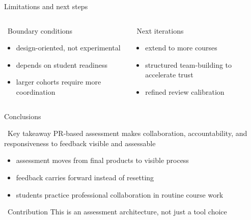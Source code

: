 \documentclass[
    NAME={Dr. Helga Ingimundardóttir},
    EMAIL={helgaingim@hi.is},
    FACULTY={Industrial Engineering},
    TITLE={Using Pull Requests to Make Collaboration Visible in CDIO Project-Based Courses},
    SEMINAR={22\textsuperscript{nd} International CDIO Conference},
    DATE={June 22\textsuperscript{nd} 2026},
    WIDE=true
]{HI-LaTeX/hi-beamer}
\begin{document}
\begin{frame}{Limitations and next steps}
\begin{columns}[T,onlytextwidth]
\begin{column}{.48\textwidth}
\begin{block}{\faLock~Boundary conditions}
\begin{itemize}
    \item design-oriented, not experimental
    \item depends on student readiness
    \item larger cohorts require more coordination
\end{itemize}
\end{block}
\end{column}
\begin{column}{.48\textwidth}
\begin{block}{\faArrowTrendUp~Next iterations}
\begin{itemize}
    \item extend to more courses
    \item structured team-building to accelerate trust
    \item refined review calibration
\end{itemize}
\end{block}
\end{column}
\end{columns}
\end{frame}
\begin{frame}{Conclusions}
\begin{exampleblock}{\faFlagCheckered~Key takeaway}
PR-based assessment makes collaboration, accountability, and responsiveness to feedback visible and assessable
\end{exampleblock}
\begin{itemize}
    \item assessment moves from final products to visible process
    \item feedback carries forward instead of resetting
    \item students practice professional collaboration in routine course work
\end{itemize}
\vspace{0.4em}
\begin{alertblock}{\faLightbulb~Contribution}
This is an assessment architecture, not just a tool choice
\end{alertblock}
\end{frame}
\end{document}
